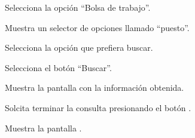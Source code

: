 \begin{UCtrayectoria}
	
	\UCpaso[\UCactor] Selecciona la opción “Bolsa de trabajo”.
	
	\UCpaso[\UCsist]  Muestra un selector de opciones llamado “puesto”.
	
	\UCpaso[\UCsist] Selecciona la opción que prefiera buscar. 
	
	\UCpaso[\UCsist] Selecciona el botón “Buscar”.
	
	\UCpaso[\UCsist] Muestra la pantalla  con la información obtenida.
	
	\UCpaso[\UCactor] Solcita terminar la consulta presionando el botón . \label{CUTI5.1-8:terminaConsulta}
	
	\UCpaso[\UCsist] Muestra la pantalla .
	
\end{UCtrayectoria}
